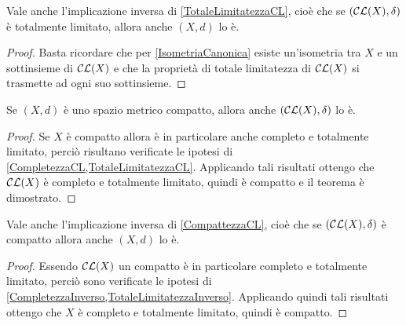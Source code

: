 \begin{remark}\label{TotaleLimitatezzaInverso}
	Vale anche l'implicazione inversa di \cref{TotaleLimitatezzaCL}, cioè che se  $(\mathcal{CL}(X),\delta)$ è totalmente limitato, allora anche $(X,d)$ lo è.
\end{remark}
\begin{proof}
	Basta ricordare che per \cref{IsometriaCanonica} esiste un'isometria tra $X$ e un sottinsieme di $\mathcal{CL}(X)$ e che la proprietà di totale limitatezza di $\mathcal{CL}(X)$ si trasmette ad ogni suo sottinsieme.
\end{proof}



\begin{theorem} \label{CompattezzaCL}
	Se $(X,d)$ è uno spazio metrico compatto, allora anche $(\mathcal{CL}(X),\delta)$ lo è.
\end{theorem}
\begin{proof}
	Se $X$ è compatto allora è in particolare anche completo e totalmente limitato, perciò risultano verificate le ipotesi di \cref{CompletezzaCL,TotaleLimitatezzaCL}. Applicando tali risultati ottengo che $\mathcal{CL}(X)$ è completo e totalmente limitato, quindi è compatto e il teorema è dimostrato.
\end{proof}

\begin{remark} \label{CompattezzaInverso}
	Vale anche l'implicazione inversa di \cref{CompattezzaCL}, cioè che se  $(\mathcal{CL}(X),\delta)$ è compatto allora anche $(X,d)$ lo è.
\end{remark}
\begin{proof}
	Essendo $\mathcal{CL}(X)$ un compatto è in particolare completo e totalmente limitato, perciò sono verificate le ipotesi di \cref{CompletezzaInverso,TotaleLimitatezzaInverso}. Applicando quindi tali risultati ottengo che $X$ è completo e totalmente limitato, quindi è compatto.
\end{proof}

